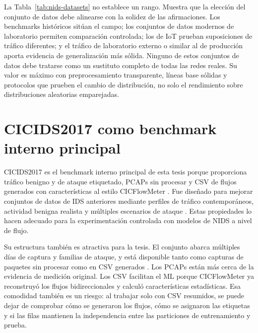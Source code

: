 La Tabla~\ref{tab:nids-datasets} no establece un rango. Muestra que la elección del conjunto de datos debe alinearse con la solidez de las afirmaciones. Los benchmarks históricos sitúan el campo; los conjuntos de datos modernos de laboratorio permiten comparación controlada; los de IoT prueban suposiciones de tráfico diferentes; y el tráfico de laboratorio externo o similar al de producción aporta evidencia de generalización más sólida. Ninguno de estos conjuntos de datos debe tratarse como un sustituto completo de todas las redes reales. Su valor es máximo con preprocesamiento transparente, líneas base sólidas y protocolos que prueben el cambio de distribución, no solo el rendimiento sobre distribuciones aleatorias emparejadas.

\section{CICIDS2017 como benchmark interno principal}

CICIDS2017 es el benchmark interno principal de esta tesis porque proporciona tráfico benigno y de ataque etiquetado, PCAPs sin procesar y CSV de flujos generados con características al estilo CICFlowMeter \parencite{Sharafaldin2018CICIDS2017,Lashkari2017CICFlowMeter,CICIDS2017Web}. Fue diseñado para mejorar conjuntos de datos de IDS anteriores mediante perfiles de tráfico contemporáneos, actividad benigna realista y múltiples escenarios de ataque \parencite{Sharafaldin2018CICIDS2017,Sharafaldin2019Detailed}. Estas propiedades lo hacen adecuado para la experimentación controlada con modelos de NIDS a nivel de flujo.

Su estructura también es atractiva para la tesis. El conjunto abarca múltiples días de captura y familias de ataque, y está disponible tanto como capturas de paquetes sin procesar como en CSV generados \parencite{Oyelakin2023Overview}. Los PCAPs están más cerca de la evidencia de medición original. Los CSV facilitan el ML porque CICFlowMeter ya reconstruyó los flujos bidireccionales y calculó características estadísticas. Esa comodidad también es un riesgo: al trabajar solo con CSV resumidos, se puede dejar de comprobar cómo se generaron los flujos, cómo se asignaron las etiquetas y si las filas mantienen la independencia entre las particiones de entrenamiento y prueba.

